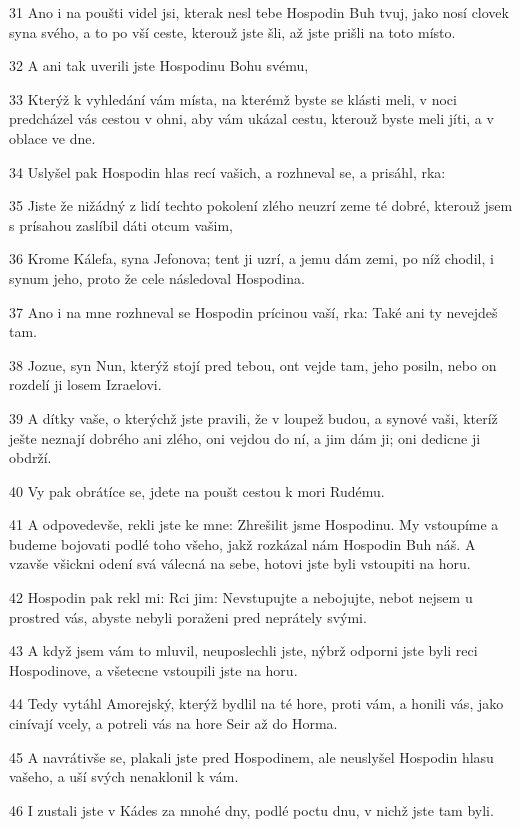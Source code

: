 \par 31 Ano i na poušti videl jsi, kterak nesl tebe Hospodin Buh tvuj, jako nosí clovek syna svého, a to po vší ceste, kterouž jste šli, až jste prišli na toto místo.
\par 32 A ani tak uverili jste Hospodinu Bohu svému,
\par 33 Kterýž k vyhledání vám místa, na kterémž byste se klásti meli, v noci predcházel vás cestou v ohni, aby vám ukázal cestu, kterouž byste meli jíti, a v oblace ve dne.
\par 34 Uslyšel pak Hospodin hlas recí vašich, a rozhneval se, a prisáhl, rka:
\par 35 Jiste že nižádný z lidí techto pokolení zlého neuzrí zeme té dobré, kterouž jsem s prísahou zaslíbil dáti otcum vašim,
\par 36 Krome Kálefa, syna Jefonova; tent ji uzrí, a jemu dám zemi, po níž chodil, i synum jeho, proto že cele následoval Hospodina.
\par 37 Ano i na mne rozhneval se Hospodin prícinou vaší, rka: Také ani ty nevejdeš tam.
\par 38 Jozue, syn Nun, kterýž stojí pred tebou, ont vejde tam, jeho posiln, nebo on rozdelí ji losem Izraelovi.
\par 39 A dítky vaše, o kterýchž jste pravili, že v loupež budou, a synové vaši, kteríž ješte neznají dobrého ani zlého, oni vejdou do ní, a jim dám ji; oni dedicne ji obdrží.
\par 40 Vy pak obrátíce se, jdete na poušt cestou k mori Rudému.
\par 41 A odpovedevše, rekli jste ke mne: Zhrešilit jsme Hospodinu. My vstoupíme a budeme bojovati podlé toho všeho, jakž rozkázal nám Hospodin Buh náš. A vzavše všickni odení svá válecná na sebe, hotovi jste byli vstoupiti na horu.
\par 42 Hospodin pak rekl mi: Rci jim: Nevstupujte a nebojujte, nebot nejsem u prostred vás, abyste nebyli poraženi pred neprátely svými.
\par 43 A když jsem vám to mluvil, neuposlechli jste, nýbrž odporni jste byli reci Hospodinove, a všetecne vstoupili jste na horu.
\par 44 Tedy vytáhl Amorejský, kterýž bydlil na té hore, proti vám, a honili vás, jako cinívají vcely, a potreli vás na hore Seir až do Horma.
\par 45 A navrátivše se, plakali jste pred Hospodinem, ale neuslyšel Hospodin hlasu vašeho, a uší svých nenaklonil k vám.
\par 46 I zustali jste v Kádes za mnohé dny, podlé poctu dnu, v nichž jste tam byli.

